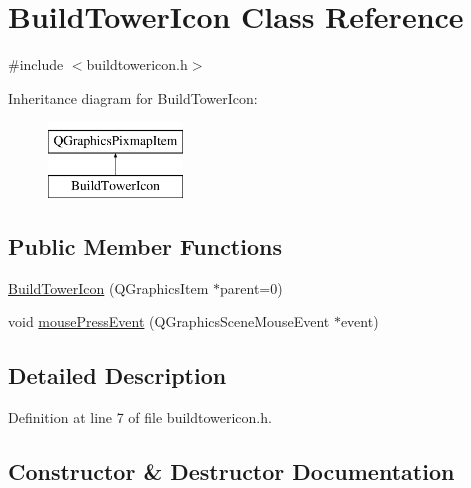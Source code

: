 \hypertarget{class_build_tower_icon}{}\section{Build\+Tower\+Icon Class Reference}
\label{class_build_tower_icon}


{\ttfamily \#include $<$buildtowericon.\+h$>$}

Inheritance diagram for Build\+Tower\+Icon\+:\begin{figure}[H]
\begin{center}
\leavevmode
\includegraphics[height=2.000000cm]{class_build_tower_icon}
\end{center}
\end{figure}
\subsection*{Public Member Functions}
\begin{DoxyCompactItemize}
\item 
\hyperlink{class_build_tower_icon_a33a4d4435224d5ee68e6b1fa2a1dc5b4}{Build\+Tower\+Icon} (Q\+Graphics\+Item $\ast$parent=0)
\item 
void \hyperlink{class_build_tower_icon_a4232a6267dd0b252eb4bd58b36becc11}{mouse\+Press\+Event} (Q\+Graphics\+Scene\+Mouse\+Event $\ast$event)
\end{DoxyCompactItemize}


\subsection{Detailed Description}


Definition at line 7 of file buildtowericon.\+h.



\subsection{Constructor \& Destructor Documentation}
\mbox{\label{class_build_tower_icon_a33a4d4435224d5ee68e6b1fa2a1dc5b4}} 

